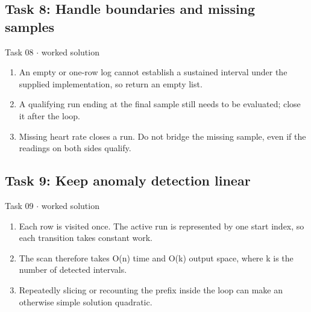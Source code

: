 \documentclass[11pt]{article}
\begin{document}
\begin{keepsection}\subsection{Task 8: Handle boundaries and missing samples}

\begin{workedbox}{Task 08 \ensuremath{\cdot} worked solution}
\begin{enumerate}
\item An empty or one-row log cannot establish a sustained interval under the supplied implementation, so return an empty list.
\item A qualifying run ending at the final sample still needs to be evaluated; close it after the loop.
\item Missing heart rate closes a run. Do not bridge the missing sample, even if the readings on both sides qualify.
\end{enumerate}
\end{workedbox}

\end{keepsection}
\begin{keepsection}\subsection{Task 9: Keep anomaly detection linear}

\begin{workedbox}{Task 09 \ensuremath{\cdot} worked solution}
\begin{enumerate}
\item Each row is visited once. The active run is represented by one start index, so each transition takes constant work.
\item The scan therefore takes O(n) time and O(k) output space, where k is the number of detected intervals.
\item Repeatedly slicing or recounting the prefix inside the loop can make an otherwise simple solution quadratic.
\end{enumerate}
\end{workedbox}

\end{keepsection}
\end{document}
